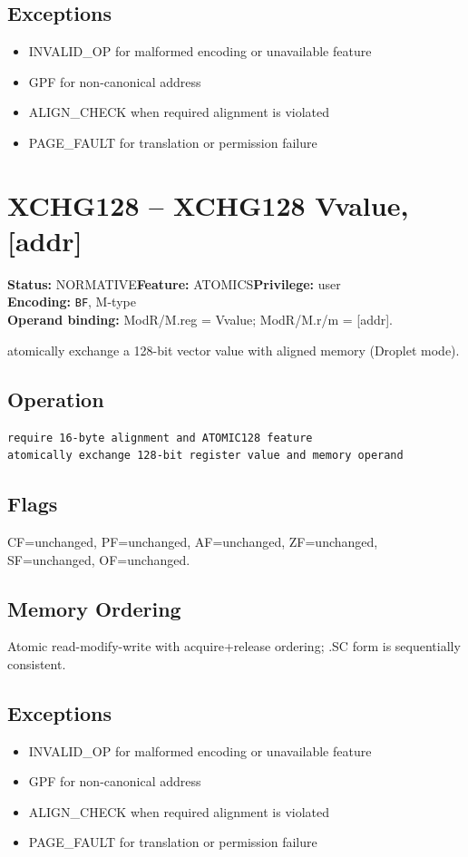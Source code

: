 \documentclass[10pt]{article}
\begin{document}
\subsection*{Exceptions}
\begin{itemize}
\item INVALID\_OP for malformed encoding or unavailable feature
\item GPF for non-canonical address
\item ALIGN\_CHECK when required alignment is violated
\item PAGE\_FAULT for translation or permission failure
\end{itemize}
\clearpage

\section{XCHG128 -- XCHG128 Vvalue, [addr]}
\textbf{Status:} NORMATIVE\quad \textbf{Feature:} ATOMICS\quad \textbf{Privilege:} user\\
\textbf{Encoding:} \texttt{BF}, M-type\\
\textbf{Operand binding:} ModR/M.reg = Vvalue; ModR/M.r/m = [addr].

atomically exchange a 128-bit vector value with aligned memory (Droplet mode).

\subsection*{Operation}
\begin{lstlisting}
require 16-byte alignment and ATOMIC128 feature
atomically exchange 128-bit register value and memory operand
\end{lstlisting}
\subsection*{Flags}
CF=unchanged, PF=unchanged, AF=unchanged, ZF=unchanged, SF=unchanged, OF=unchanged.
\subsection*{Memory Ordering}
Atomic read-modify-write with acquire+release ordering; .SC form is sequentially consistent.
\subsection*{Exceptions}
\begin{itemize}
\item INVALID\_OP for malformed encoding or unavailable feature
\item GPF for non-canonical address
\item ALIGN\_CHECK when required alignment is violated
\item PAGE\_FAULT for translation or permission failure
\end{itemize}
\clearpage
\end{document}
